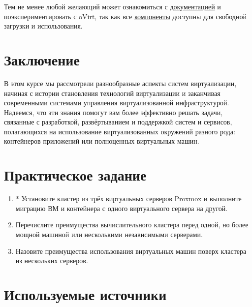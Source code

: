 \documentclass[14pt, a4paper]{article}
\begin{document}
Тем не менее любой желающий может ознакомиться с \href{https://www.ovirt.org/documentation/}{документацией} и поэкспериментировать с oVirt,
так как все \href{https://www.ovirt.org/download/}{компоненты} доступны для свободной загрузки и использования.

\section*{Заключение} 

В этом курсе мы рассмотрели разнообразные аспекты систем виртуализации, начиная с истории
становления технологий виртуализации и заканчивая современными системами управления
виртуализованной инфраструктурой. Надеемся, что эти знания помогут вам более эффективно
решать задачи, связанные с разработкой, развёртыванием и поддержкой систем и сервисов,
полагающихся на использование виртуализованных окружений разного рода: контейнеров
приложений или полноценных виртуальных машин.

\newpage

\section*{Практическое задание} 

\begin{enumerate}
    \item * Установите кластер из трёх виртуальных серверов Proxmox и выполните миграцию ВМ и
    контейнера с одного виртуального сервера на другой.
    \item Перечислите преимущества вычислительного кластера перед одной, но более мощной
    машиной или несколькими независимыми серверами.
    \item Назовите преимущества использования виртуальных машин поверх кластера из нескольких
    серверов.
\end{enumerate}

\section*{Используемые источники} 
\end{document}
